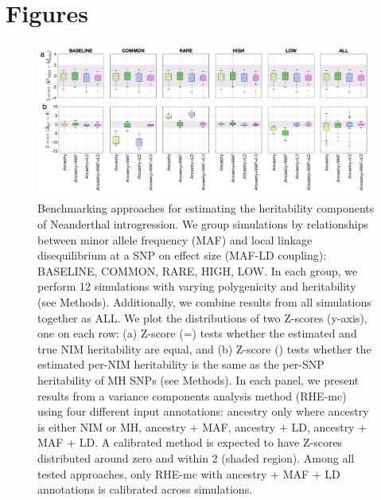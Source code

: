 \section{Figures}
\begin{figure}[!htb]
    \centering
    \includegraphics[width=\textwidth]{chapter3/figures/fig3.1.png}
    \caption{Benchmarking approaches for estimating the heritability components of Neanderthal introgression. We group simulations by relationships between minor allele frequency (MAF) and local linkage disequilibrium at a SNP on effect size (MAF-LD coupling): BASELINE, COMMON, RARE, HIGH, LOW. In each group, we perform 12 simulations with varying polygenicity and heritability (see Methods). Additionally, we combine results from all simulations together as ALL. We plot the distributions of two Z-scores (y-axis), one on each row: (a) Z-score (=) tests whether the estimated and true NIM heritability are equal, and (b) Z-score () tests whether the estimated per-NIM heritability is the same as the per-SNP heritability of MH SNPs (see Methods). In each panel, we present results from a variance components analysis method (RHE-mc) using four different input annotations: ancestry only where ancestry is either NIM or MH, ancestry + MAF, ancestry + LD, ancestry + MAF + LD. A calibrated method is expected to have Z-scores distributed around zero and within 2 (shaded region). Among all tested approaches, only RHE-mc with ancestry + MAF + LD annotations is calibrated across simulations.}
    \label{fig:3.1}
\end{figure}

